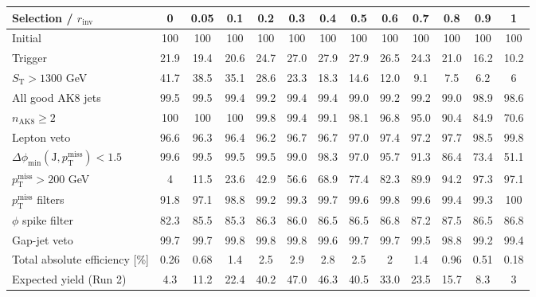 {\footnotesize\setlength{\tabcolsep}{1.45pt}\renewcommand{\arraystretch}{0.82}%
\begin{tabular}{@{}lcccccccccccc@{}}
\hline
Selection / $r_{\mathrm{inv}}$ & 0 & 0.05 & 0.1 & 0.2 & 0.3 & 0.4 & 0.5 & 0.6 & 0.7 & 0.8 & 0.9 & 1 \\
\hline
Initial & 100 & 100 & 100 & 100 & 100 & 100 & 100 & 100 & 100 & 100 & 100 & 100 \\
Trigger & 21.9 & 19.4 & 20.6 & 24.7 & 27.0 & 27.9 & 27.9 & 26.5 & 24.3 & 21.0 & 16.2 & 10.2 \\
$S_{\mathrm{T}}>1300$ GeV & 41.7 & 38.5 & 35.1 & 28.6 & 23.3 & 18.3 & 14.6 & 12.0 & 9.1 & 7.5 & 6.2 & 6 \\
All good AK8 jets & 99.5 & 99.5 & 99.4 & 99.2 & 99.4 & 99.4 & 99.0 & 99.2 & 99.2 & 99.0 & 98.9 & 98.6 \\
$n_{\mathrm{AK8}}\geq 2$ & 100 & 100 & 100 & 99.8 & 99.4 & 99.1 & 98.1 & 96.8 & 95.0 & 90.4 & 84.9 & 70.6 \\
Lepton veto & 96.6 & 96.3 & 96.4 & 96.2 & 96.7 & 96.7 & 97.0 & 97.4 & 97.2 & 97.7 & 98.5 & 99.8 \\
$\Delta\phi_{\min}(\mathrm{J},p_{\mathrm{T}}^{\mathrm{miss}})<1.5$ & 99.6 & 99.5 & 99.5 & 99.5 & 99.0 & 98.3 & 97.0 & 95.7 & 91.3 & 86.4 & 73.4 & 51.1 \\
$p_{\mathrm{T}}^{\mathrm{miss}}>200$ GeV & 4 & 11.5 & 23.6 & 42.9 & 56.6 & 68.9 & 77.4 & 82.3 & 89.9 & 94.2 & 97.3 & 97.1 \\
$p_{\mathrm{T}}^{\mathrm{miss}}$ filters & 91.8 & 97.1 & 98.8 & 99.2 & 99.3 & 99.7 & 99.6 & 99.8 & 99.6 & 99.4 & 99.3 & 100 \\
$\phi$ spike filter & 82.3 & 85.5 & 85.3 & 86.3 & 86.0 & 86.5 & 86.5 & 86.8 & 87.2 & 87.5 & 86.5 & 86.8 \\
Gap-jet veto & 99.7 & 99.7 & 99.8 & 99.8 & 99.8 & 99.6 & 99.7 & 99.7 & 99.5 & 98.8 & 99.2 & 99.4 \\
\hline
Total absolute efficiency [\%] & 0.26 & 0.68 & 1.4 & 2.5 & 2.9 & 2.8 & 2.5 & 2 & 1.4 & 0.96 & 0.51 & 0.18 \\
\hline
Expected yield (Run 2) & 4.3 & 11.2 & 22.4 & 40.2 & 47.0 & 46.3 & 40.5 & 33.0 & 23.5 & 15.7 & 8.3 & 3 \\
\hline
\end{tabular}%
}
